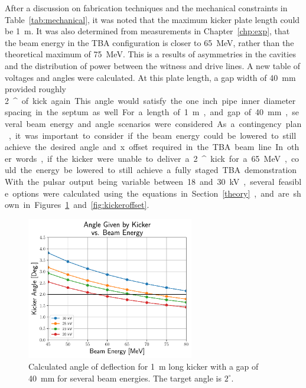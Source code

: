 \documentclass[aps,prab,preprint,groupedaddress,linenumbers]{revtex4-2}
\begin{document}
After a discussion on fabrication techniques and the mechanical constraints in Table~\ref{tab:mechanical}, 
it was noted that the maximum kicker plate length could be \SI{1}{m}. 
It was also determined from measurements in Chapter~\ref{chp:exp}, 
that the beam energy in the TBA configuration is closer to \SI{65}{MeV}, 
rather than the theoretical maximum of \SI{75}{MeV}.
This is a results of asymmetries in the cavities and the distribution of power
between the witness and drive lines.
A new table of voltages and angles were calculated. At this plate length, 
a gap width of \SI{40}{mm} provided roughly \SI{2}{^\circ} of kick again. 
This angle would satisfy the one inch pipe inner diameter spacing in the septum as well. 

For a length of \SI{1}{m}, and gap of \SI{40}{mm}, 
several beam energy and angle scenarios were considered.
As a contingency plan, it was important to consider if the 
beam energy could be lowered to still achieve the desired 
angle and x offset required in the TBA beam line. 
In other words, if the kicker were unable to deliver a \SI{2}{^\circ}
kick for a \SI{65}{MeV}, could the energy be lowered to still achieve
a fully staged TBA demonstration. 
With the pulsar output being variable between 18 and 30 kV,
several feasible options were calculated using the equations in Section~\ref{theory}, 
and are shown in Figures~\ref{fig:kickerangles} and~\ref{fig:kickeroffset}.
\begin{figure}%
	\begin{center}
		\includegraphics[width=0.65\textwidth]{AngleVsEnergy}
		\caption{Calculated angle of deflection for \SI{1}{m} long 
			kicker with a gap of \SI{40}{mm} for several beam energies. The target angle is $2^\circ$.}
		\label{fig:kickerangles}
	\end{center}
\end{figure}
\end{document}
